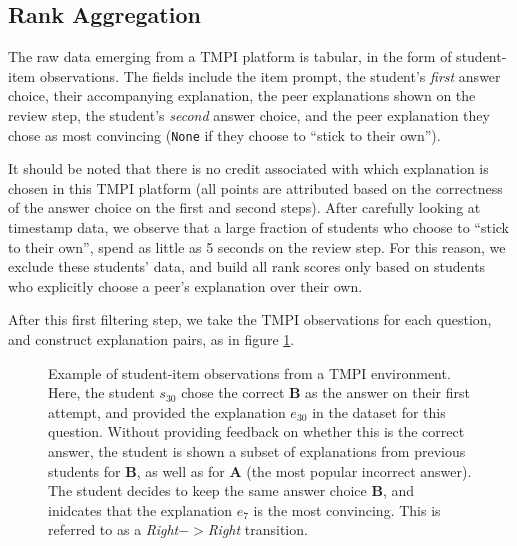 \documentclass[sigconf]{acmart}
\begin{document}
\subsection{Rank Aggregation}
The raw data emerging from a TMPI platform is tabular, in the form of 
student-item observations.
The fields include the item prompt, the student's \textit{first} answer choice, 
their accompanying explanation, the peer explanations shown on the review step, 
the student's \textit{second} answer choice, and the peer explanation they 
chose as most convincing (\verb|None| if they choose to ``stick to their own'').

It should be noted that there is no credit associated with which explanation is 
chosen in this TMPI platform (all points are attributed based on the 
correctness of the answer choice on the first and second steps).
After carefully looking at timestamp data, we observe that a large fraction of 
students who choose to ``stick to their own'', spend as little as 5 seconds on 
the review step.
For this reason, we exclude these students' data, and build all rank scores 
only based on students who explicitly choose a peer's explanation over their 
own.

After this first filtering step, we take the TMPI observations for each 
question, and construct explanation pairs, as in figure 
\ref{fig:make_pairs_a}.


\begin{figure}
	\caption{
	Example of student-item observations from a TMPI environment. 
	Here, the student $s_{30}$ chose the correct \textbf{B} as the answer on 
	their first attempt, and provided the explanation $e_{30}$ in the dataset 
	for this question. 
	Without providing feedback on whether this is the correct answer, the 
	student is shown a subset of explanations from previous students for 
	\textbf{B}, as well as for \textbf{A} (the most popular incorrect answer). 
	The student decides to keep the same answer choice \textbf{B}, and 
	inidcates that the explanation $e_7$ is the most convincing.
	This is referred to as a \textit{Right}$->$\textit{Right} transition. 
	}
	\label{fig:make_pairs_a}
\end{figure}
\end{document}
